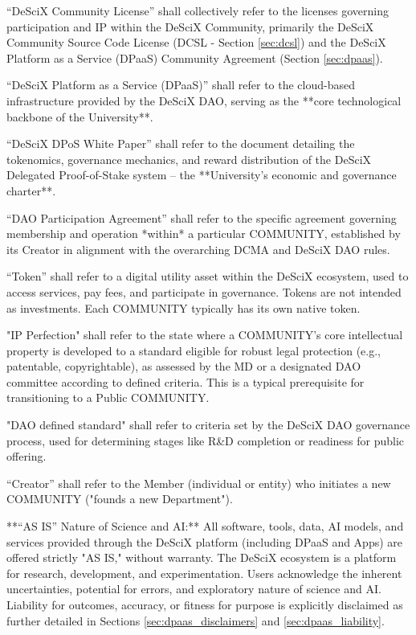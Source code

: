 \documentclass{article}
\begin{document}
“DeSciX Community License” shall collectively refer to the licenses governing participation and IP within the DeSciX Community, primarily the DeSciX Community Source Code License (DCSL - Section \ref{sec:dcsl}) and the DeSciX Platform as a Service (DPaaS) Community Agreement (Section \ref{sec:dpaas}).

“DeSciX Platform as a Service (DPaaS)” shall refer to the cloud-based infrastructure provided by the DeSciX DAO, serving as the **core technological backbone of the University**.

“DeSciX DPoS White Paper” shall refer to the document detailing the tokenomics, governance mechanics, and reward distribution of the DeSciX Delegated Proof-of-Stake system – the **University's economic and governance charter**.

“DAO Participation Agreement” shall refer to the specific agreement governing membership and operation *within* a particular COMMUNITY, established by its Creator in alignment with the overarching DCMA and DeSciX DAO rules.

“Token” shall refer to a digital utility asset within the DeSciX ecosystem, used to access services, pay fees, and participate in governance. Tokens are not intended as investments. Each COMMUNITY typically has its own native token.

"IP Perfection" shall refer to the state where a COMMUNITY's core intellectual property is developed to a standard eligible for robust legal protection (e.g., patentable, copyrightable), as assessed by the MD or a designated DAO committee according to defined criteria. This is a typical prerequisite for transitioning to a Public COMMUNITY.

"DAO defined standard" shall refer to criteria set by the DeSciX DAO governance process, used for determining stages like R\&D completion or readiness for public offering.

“Creator” shall refer to the Member (individual or entity) who initiates a new COMMUNITY ("founds a new Department").

**“AS IS” Nature of Science and AI:** All software, tools, data, AI models, and services provided through the DeSciX platform (including DPaaS and Apps) are offered strictly "AS IS," without warranty. The DeSciX ecosystem is a platform for research, development, and experimentation. Users acknowledge the inherent uncertainties, potential for errors, and exploratory nature of science and AI. Liability for outcomes, accuracy, or fitness for purpose is explicitly disclaimed as further detailed in Sections \ref{sec:dpaas_disclaimers} and \ref{sec:dpaas_liability}.
\end{document}
